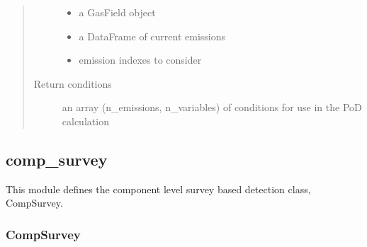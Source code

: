 \documentclass[letterpaper,10pt,english]{sphinxmanual}
\begin{document}
\begin{fulllineitems}
\begin{fulllineitems}
\begin{quote}
\begin{description}
\begin{itemize}
\item {} 
 \textendash{} a GasField object

\item {} 
 \textendash{} a DataFrame of current emissions

\item {} 
 \textendash{} emission indexes to consider

\end{itemize}

\item[{Return conditions}] \leavevmode
an array (n\_emissions, n\_variables) of conditions for use in the PoD calculation

\end{description}\end{quote}

\end{fulllineitems}


\end{fulllineitems}



\subsection{comp\_survey}
\label{\detokenize{index:module-feast.DetectionModules.comp_survey}}\label{\detokenize{index:comp-survey}}
This module defines the component level survey based detection class, CompSurvey.


\subsubsection{CompSurvey}
\label{\detokenize{index:compsurvey}}
\end{document}
